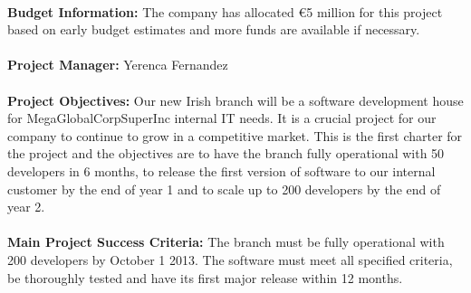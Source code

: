 		\paragraph{}
			\vspace{10mm}
			\textbf{Budget Information:} \newline The company has allocated €5 million for this project based on early budget estimates and more funds are available if necessary.
			\newline\newline
			
		\paragraph{}
			\vspace{5mm}
			\textbf{Project Manager:}  Yerenca Fernandez
			\newline\newline

		\paragraph{}
			\vspace{5mm}
			\textbf{Project Objectives:} \newline Our new Irish branch will be a software development house for MegaGlobalCorpSuperInc internal IT needs. 
			It is a crucial project for our company to continue to grow in a competitive market. 
			This is the first charter for the project and the objectives are to have the branch fully 
			operational with 50 developers in 6 months, to release the first version of software to our 
			internal customer by the end of year 1 and to scale up to 200 developers by the end of year 2.
			\newline\newline

		\paragraph{}
			\vspace{5mm}
			\textbf{Main Project Success Criteria:} 
			\newline
			The branch must be fully operational with 200 developers by October 1 2013. The software must meet all 
			specified criteria, be thoroughly tested and have its first major release within 12 months.
			\newline\newline

